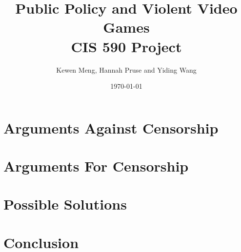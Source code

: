 \documentclass[11pt]{article}
\title{%
  Public Policy and Violent Video Games \\
  \large CIS 590 Project\vspace{-2ex}}
\author{Kewen Meng, Hannah Pruse and Yiding Wang}
\date{\today}
\begin{document}
\maketitle
\vspace{-10mm}



\section*{Arguments Against Censorship}


\section*{Arguments For Censorship}

 
\section*{Possible Solutions}


\section*{Conclusion}



\end{document}
